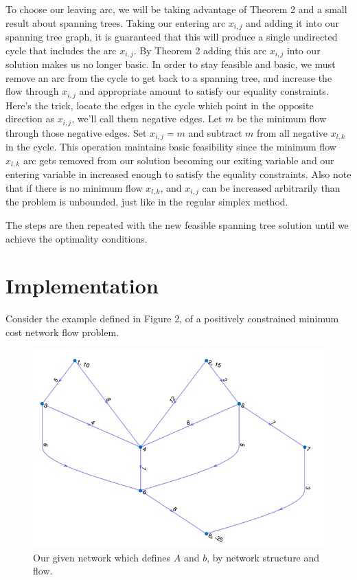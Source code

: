 \documentclass[12pt]{amsart}
\begin{document}
To choose our leaving arc, we will be taking advantage of Theorem 2 and a small result about spanning trees. Taking our entering arc $x_{i, j}$ and adding it into our spanning tree graph, it is 
guaranteed that this will produce a single undirected cycle that includes the arc $x_{i, j}$. By Theorem 2 adding this arc $x_ {i, j}$ into our solution makes us no longer basic. 
In order to stay feasible and basic, we must remove an arc from the cycle to get back to a spanning tree, and increase the flow through $x_{i, j}$ and appropriate amount to satisfy our equality constraints. Here's the trick, 
locate the edges in the cycle which point in the opposite direction as $x_{i, j}$, we'll call them negative edges. Let $m$ be the minimum flow through those negative edges. Set $x_{i, j} = m$ and 
subtract $m$ from all negative $x_{l, k}$ in the cycle. This operation maintains basic feasibility since the minimum flow $x_{l, k}$ arc gets removed from our solution becoming our exiting variable and our 
entering variable in increased enough to satisfy the equality constraints. Also note that if there is no minimum flow $x_{l, k}$, and $x_{i, j}$ can be increased arbitrarily than
the problem is unbounded, just like in the regular simplex method. 

The steps are then repeated with the new feasible spanning tree solution until we achieve the optimality conditions. 


\section{Implementation} Consider the example defined in Figure 2, of a positively constrained minimum cost network flow problem.
\begin{figure}
\includegraphics[width=.80\textwidth]{untitled.png}  %
\caption{Our given network which defines $A$ and $b$, by network structure and flow. }
\end{figure}
\end{document}

